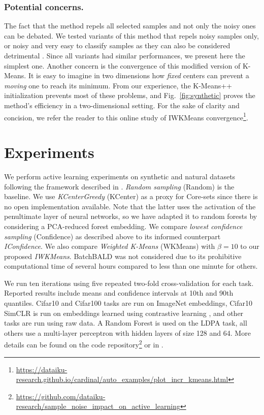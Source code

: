 \documentclass[runningheads]{llncs}
\begin{document}
\subsubsection{Potential concerns.} The fact that the method repels all selected samples and not only the noisy ones can be debated.
We tested variants of this method that repels noisy samples only, or noisy and very easy to classify samples as they can also be considered detrimental \cite{abraham2020rebuilding}.
Since all variants had similar performances, we present here the simplest one.
Another concern is the convergence of this modified version of K-Means. It is easy to imagine in two dimensions how \emph{fixed} centers can prevent a \emph{moving} one to reach its minimum. From our experience, the K-Means++ initialization prevents most of these problems, and Fig.~\ref{fig:synthetic} proves the method's efficiency in a two-dimensional setting. For the sake of clarity and concision, we refer the reader to this online study of IWKMeans convergence\footnote{\url{https://dataiku-research.github.io/cardinal/auto_examples/plot_incr_kmeans.html}}.

\section{Experiments}
\label{sec:exp}

We perform active learning experiments on synthetic and natural datasets following the framework described in \cite{abraham2020rebuilding}. \emph{Random sampling} (Random) is the baseline. We use \textit{KCenterGreedy} (KCenter) as a proxy for Core-sets \cite{sener2017active} since there is no open implementation available. Note that the latter uses the activation of the penultimate layer of neural networks, so we have adapted it to random forests by considering a PCA-reduced forest embedding. We compare \emph{lowest confidence sampling} (Confidence) as described above to its informed counterpart \textit{IConfidence}. We also compare \emph{Weighted K-Means}\cite{zhdanov2019diverse} (WKMeans) with $\beta=10$ to our proposed \textit{IWKMeans}. BatchBALD\cite{kirsch2019batchbald} was not considered due to its prohibitive computational time of several hours compared to less than one minute for others.

We run ten iterations using five repeated two-fold cross-validation for each task. Reported results include means and confidence intervals at 10th and 90th quantiles. Cifar10 and Cifar100 tasks are run on ImageNet embeddings, Cifar10 SimCLR is run on embeddings learned using contrastive learning \cite{chen2020simple}, and other tasks are run using raw data. A Random Forest is used on the LDPA task, all others use a multi-layer perceptron with hidden layers of size 128 and 64. More details can be found on the code repository\footnote{\url{https://github.com/dataiku-research/sample_noise_impact_on_active_learning}} or in \cite{abraham2020rebuilding}.
\end{document}
